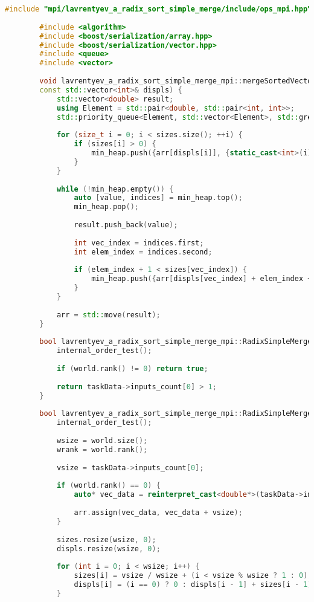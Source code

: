 \documentclass[12pt]{article}
\begin{document}
	\begin{lstlisting}[language=C++]
		#include "mpi/lavrentyev_a_radix_sort_simple_merge/include/ops_mpi.hpp"
		
		#include <algorithm>
		#include <boost/serialization/array.hpp>
		#include <boost/serialization/vector.hpp>
		#include <queue>
		#include <vector>
		
		void lavrentyev_a_radix_sort_simple_merge_mpi::mergeSortedVectorsInPlace(std::vector<double>& arr, const std::vector<int>& sizes,
		const std::vector<int>& displs) {
			std::vector<double> result;
			using Element = std::pair<double, std::pair<int, int>>;
			std::priority_queue<Element, std::vector<Element>, std::greater<>> min_heap;
			
			for (size_t i = 0; i < sizes.size(); ++i) {
				if (sizes[i] > 0) {
					min_heap.push({arr[displs[i]], {static_cast<int>(i), 0}});
				}
			}
			
			while (!min_heap.empty()) {
				auto [value, indices] = min_heap.top();
				min_heap.pop();
				
				result.push_back(value);
				
				int vec_index = indices.first;
				int elem_index = indices.second;
				
				if (elem_index + 1 < sizes[vec_index]) {
					min_heap.push({arr[displs[vec_index] + elem_index + 1], {vec_index, elem_index + 1}});
				}
			}
			
			arr = std::move(result);
		}
		
		bool lavrentyev_a_radix_sort_simple_merge_mpi::RadixSimpleMerge::validation() {
			internal_order_test();
			
			if (world.rank() != 0) return true;
			
			return taskData->inputs_count[0] > 1;
		}
		
		bool lavrentyev_a_radix_sort_simple_merge_mpi::RadixSimpleMerge::pre_processing() {
			internal_order_test();
			
			wsize = world.size();
			wrank = world.rank();
			
			vsize = taskData->inputs_count[0];
			
			if (world.rank() == 0) {
				auto* vec_data = reinterpret_cast<double*>(taskData->inputs[0]);
				
				arr.assign(vec_data, vec_data + vsize);
			}
			
			sizes.resize(wsize, 0);
			displs.resize(wsize, 0);
			
			for (int i = 0; i < wsize; i++) {
				sizes[i] = vsize / wsize + (i < vsize % wsize ? 1 : 0);
				displs[i] = (i == 0) ? 0 : displs[i - 1] + sizes[i - 1];
			}
			

\end{lstlisting}
\end{document}
